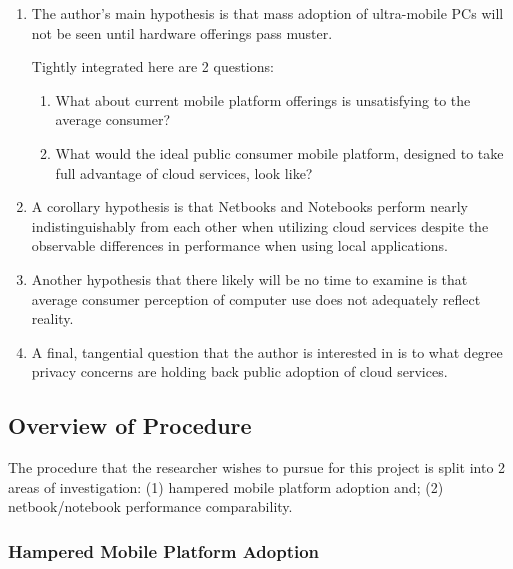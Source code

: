 \documentclass[12pt,oneside,letterpaper,titlepage]{article}
\begin{document}
\begin{enumerate}

  \item The author's main hypothesis is that mass adoption of ultra-mobile PCs
    will not be seen until hardware offerings pass muster.

  Tightly integrated here are 2 questions:

  \begin{enumerate}

    \item What about current mobile platform offerings is unsatisfying to the
      average consumer?

    \item What would the ideal public consumer mobile platform, designed to take
      full advantage of cloud services, look like?

  \end{enumerate}

  \item A corollary hypothesis is that Netbooks and Notebooks perform nearly
    indistinguishably from each other when utilizing cloud services despite the
    observable differences in performance when using local applications.

  \item Another hypothesis that there likely will be no time to examine is that
    average consumer perception of computer use does not adequately reflect
    reality.

  \item A final, tangential question that the author is interested in is to what
    degree privacy concerns are holding back public adoption of cloud services.

\end{enumerate}

\subsection{Overview of Procedure}

The procedure that the researcher wishes to pursue for this project is split
into 2 areas of investigation: (1) hampered mobile platform adoption and; (2)
netbook/notebook performance comparability.

\subsubsection{Hampered Mobile Platform Adoption}
\end{document}

